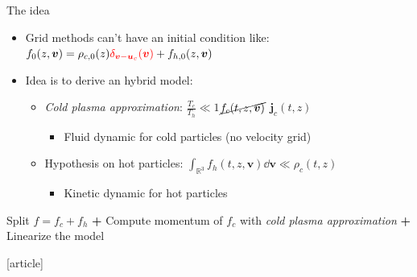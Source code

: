 \documentclass{beamer}
\newcommand{\arrow}{{\color{PLB}\ding{220}}}
\newcommand{\mbold}[1]{{\textbf{\color{PLB}#1}}}
\newcommand{\customcite}[1]{\cite{#1}}
\newcommand{\Mvb}[1]{\boldsymbol{#1}}
\begin{document}
\begin{frame}{The idea}
  \begin{itemize}
    \item Grid methods can't have an initial condition like: $f_0(z,\Mvb{v}) = \rho_{c,0}(z)\textcolor{red}{\delta_{\Mvb{v}-\Mvb{u}_c}(\Mvb{v})} + f_{h,0}(z,\Mvb{v})$
    \item Idea is to derive an hybrid model:
        \begin{itemize}
          \item \emph{Cold plasma approximation}: $\frac{T_c}{T_h}\ll 1$\arrow $\cancel{f_c(t,z,\Mvb{v})}$ \arrow $\Mvb{j}_c(t,z)$
              \begin{itemize}
                \item Fluid dynamic for cold particles (no velocity grid)
              \end{itemize}
          \item Hypothesis on hot particles: $\int_{\mathbb{R}^3} f_h(t,z,\Mvb{v})\dd{\Mvb{v}} \ll \rho_c(t,z)$
              \begin{itemize}
                \item Kinetic dynamic for hot particles 
              \end{itemize}
        \end{itemize}
  \end{itemize}

  \vfill
 
  \arrow{} Split $f=f_c+f_h$ \mbold{+} Compute momentum of $f_c$ with \emph{cold plasma approximation} \mbold{+} Linearize the model
  \begin{thebibliography}{9}
    [article]
     \customcite{Holderied:2020}
  \end{thebibliography}
\end{frame}
\end{document}
